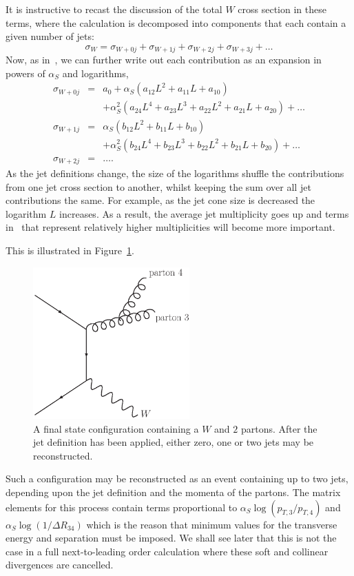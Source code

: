 \documentclass[12pt]{iopart}
\def\as{\alpha_S}
\begin{document}
It is instructive to recast the discussion of the total $W$ cross section in these terms,
where the calculation is decomposed into components that each contain a given number of jets:
\begin{equation}
\label{eq:wxsecdecomp}
\sigma_W = \sigma_{W+0j}+\sigma_{W+1j}+\sigma_{W+2j}+\sigma_{W+3j}+\ldots
\end{equation}
Now, as in~, we can further write out each contribution
as an expansion in powers of $\as$ and logarithms,
\begin{eqnarray}
\label{eq:wxseclogs}
\sigma_{W+0j} & = & a_0+\as(a_{12}L^2+a_{11}L+a_{10}) \nonumber \\
 &&+\as^2(a_{24}L^4+a_{23}L^3+a_{22}L^2+a_{21}L+a_{20}) + \ldots \nonumber \\
\sigma_{W+1j} & = &  \as(b_{12}L^2+b_{11}L+b_{10}) \nonumber \\
 &&+\as^2(b_{24}L^4+b_{23}L^3+b_{22}L^2+b_{21}L+b_{20}) + \ldots \nonumber \\
\sigma_{W+2j} & = & \ldots .
\end{eqnarray}
As the jet definitions change, the size of the logarithms shuffle the contributions from one jet cross section to
another, whilst keeping the sum over all jet contributions the same. For example, as the jet cone size is decreased the
logarithm $L$ increases. As a result,
the average jet multiplicity goes up and terms in~ that represent
relatively higher multiplicities will become more important.

This is illustrated in Figure~\ref{fig:jetexample}.
%
\begin{figure}[t]
\begin{center}
\includegraphics[width=6cm]{jetexample.ps}
\end{center}
\caption{A final state configuration containing a $W$ and $2$ partons. After the jet
definition has been applied, either zero, one or two jets may be reconstructed. \label{fig:jetexample}}
\end{figure}
%
Such a configuration may be reconstructed as an event containing up to two jets, depending upon the
jet definition and the momenta of the partons. The matrix elements for this process contain terms
proportional to $\as \log(p_{T,3}/p_{T,4})$ and $\as\log(1/\Delta R_{34})$ which is the
reason that minimum values for the transverse energy and separation must be imposed. We shall see
later that this is not the case in a full next-to-leading order calculation where these soft and
collinear divergences are cancelled.
\end{document}
